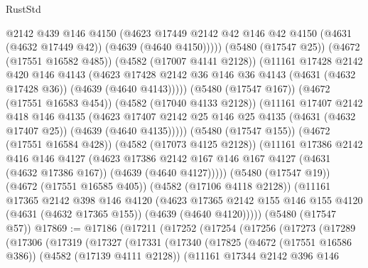 \begin{lexlean}{RustStd}
\begin{coremodule}
{\begin{coremodule}
{{{{{{{{{{{{{{{{                @2142
                @439
                @146
                @4150
                (@4623
                  @17449
                  @2142
                  @42
                  @146
                  @42
                  @4150
                  (@4631 (@4632 @17449 @42))
                  (@4639 (@4640 @4150)))))
            (@5480 (@17547 @25))
            (@4672 (@17551 @16582 @485))
            (@4582 (@17007 @4141 @2128))
            (@11161
              @17428
              @2142
              @420
              @146
              @4143
              (@4623
                @17428
                @2142
                @36
                @146
                @36
                @4143
                (@4631 (@4632 @17428 @36))
                (@4639 (@4640 @4143)))))
          (@5480 (@17547 @167))
          (@4672 (@17551 @16583 @454))
          (@4582 (@17040 @4133 @2128))
          (@11161
            @17407
            @2142
            @418
            @146
            @4135
            (@4623
              @17407
              @2142
              @25
              @146
              @25
              @4135
              (@4631 (@4632 @17407 @25))
              (@4639 (@4640 @4135)))))
        (@5480 (@17547 @155))
        (@4672 (@17551 @16584 @428))
        (@4582 (@17073 @4125 @2128))
        (@11161
          @17386
          @2142
          @416
          @146
          @4127
          (@4623
            @17386
            @2142
            @167
            @146
            @167
            @4127
            (@4631 (@4632 @17386 @167))
            (@4639 (@4640 @4127)))))
      (@5480 (@17547 @19))
      (@4672 (@17551 @16585 @405))
      (@4582 (@17106 @4118 @2128))
      (@11161
        @17365
        @2142
        @398
        @146
        @4120
        (@4623
          @17365
          @2142
          @155
          @146
          @155
          @4120
          (@4631 (@4632 @17365 @155))
          (@4639 (@4640 @4120)))))
    (@5480 (@17547 @57))
@17869 := @17186
    (@17211
      (@17252
        (@17254
          (@17256
            (@17273
              (@17289
                (@17306
                  (@17319
                    (@17327
                      (@17331
                        (@17340
                          (@17825
                            (@4672 (@17551 @16586 @386))
                            (@4582 (@17139 @4111 @2128))
                            (@11161
                              @17344
                              @2142
                              @396
                              @146
}}}}}}}}}}}}}}}}
\end{coremodule}}
\end{coremodule}
\end{lexlean}
